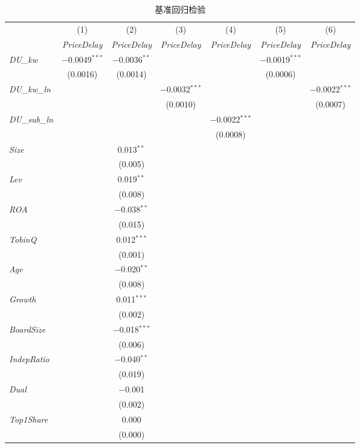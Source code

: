 \documentclass[11pt,a4paper]{article}
\begin{document}
\begin{table}[htbp]
\centering
\caption{基准回归检验}
\label{tab:baseline}
\small
\setlength{\tabcolsep}{5pt}
\begin{tabular}{l*{6}{c}}
\toprule
 & (1) & (2) & (3) & (4) & (5) & (6) \\
 & \textit{PriceDelay} & \textit{PriceDelay} & \textit{PriceDelay} & \textit{PriceDelay} & \textit{PriceDelay} & \textit{PriceDelay} \\
\midrule
\textit{DU\_kw}
 & $-$0.0049$^{***}$ & $-$0.0036$^{**}$ & & & $-$0.0019$^{***}$ & \\
 & (0.0016) & (0.0014) & & & (0.0006) & \\[4pt]
\textit{DU\_kw\_ln}
 & & & $-$0.0032$^{***}$ & & & $-$0.0022$^{***}$ \\
 & & & (0.0010) & & & (0.0007) \\[4pt]
\textit{DU\_sub\_ln}
 & & & & $-$0.0022$^{***}$ & & \\
 & & & & (0.0008) & & \\[4pt]
\textit{Size}
 & & 0.013$^{**}$ & & & & \\
 & & (0.005) & & & & \\[2pt]
\textit{Lev}
 & & 0.019$^{**}$ & & & & \\
 & & (0.008) & & & & \\[2pt]
\textit{ROA}
 & & $-$0.038$^{**}$ & & & & \\
 & & (0.015) & & & & \\[2pt]
\textit{TobinQ}
 & & 0.012$^{***}$ & & & & \\
 & & (0.001) & & & & \\[2pt]
\textit{Age}
 & & $-$0.020$^{**}$ & & & & \\
 & & (0.008) & & & & \\[2pt]
\textit{Growth}
 & & 0.011$^{***}$ & & & & \\
 & & (0.002) & & & & \\[2pt]
\textit{BoardSize}
 & & $-$0.018$^{***}$ & & & & \\
 & & (0.006) & & & & \\[2pt]
\textit{IndepRatio}
 & & $-$0.040$^{**}$ & & & & \\
 & & (0.019) & & & & \\[2pt]
\textit{Dual}
 & & $-$0.001 & & & & \\
 & & (0.002) & & & & \\[2pt]
\textit{Top1Share}
 & & 0.000 & & & & \\
 & & (0.000) & & & & \\[2pt]

\end{tabular}
\end{table}
\end{document}
